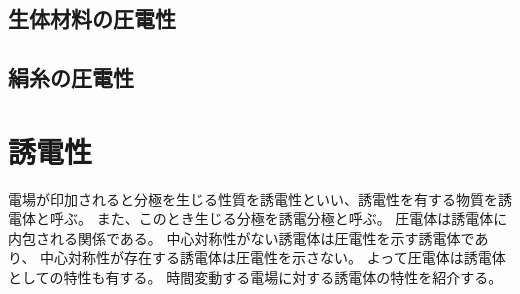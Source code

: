 \documentclass[dvipdfmx,12pt,a4paper]{jreport}
\begin{document}

			\subsection{生体材料の圧電性}
			\subsection{絹糸の圧電性}
			\newpage
		\section{誘電性}
		電場が印加されると分極を生じる性質を誘電性といい、誘電性を有する物質を誘電体と呼ぶ。
		また、このとき生じる分極を誘電分極と呼ぶ。
		圧電体は誘電体に内包される関係である。
		中心対称性がない誘電体は圧電性を示す誘電体であり、
		中心対称性が存在する誘電体は圧電性を示さない。
		よって圧電体は誘電体としての特性も有する。
		時間変動する電場に対する誘電体の特性を紹介する。
\end{document}
